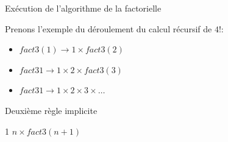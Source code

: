 \documentclass[10pt,xcolor=dvipsnames]{beamer}
\begin{document}
\begin{frame}{Exécution de l'algorithme de la factorielle}

Prenons l'exemple du déroulement du calcul récursif de $4!$:
\begin{center}
    \begin{itemize}[<+->]
\item[] $fact3(1) \rightarrow 1 \times fact3(2)$
\item[] $fact3{1} \rightarrow 1 \times 2 \times fact3(3)$
\item[] $fact3{1} \rightarrow 1 \times 2 \times 3 \times \ldots$
\end{itemize}
\end{center}

\end{frame}

\begin{frame}{Deuxième règle implicite}
        \begin{tcolorbox}
  \begin{algorithmic}[1]
        \State{} 1
      \Else
        \State{} $n \times fact3(n+1)$
      \EndIf
    \EndFunction
  \end{algorithmic}
\end{tcolorbox}
\end{frame}
\end{document}
